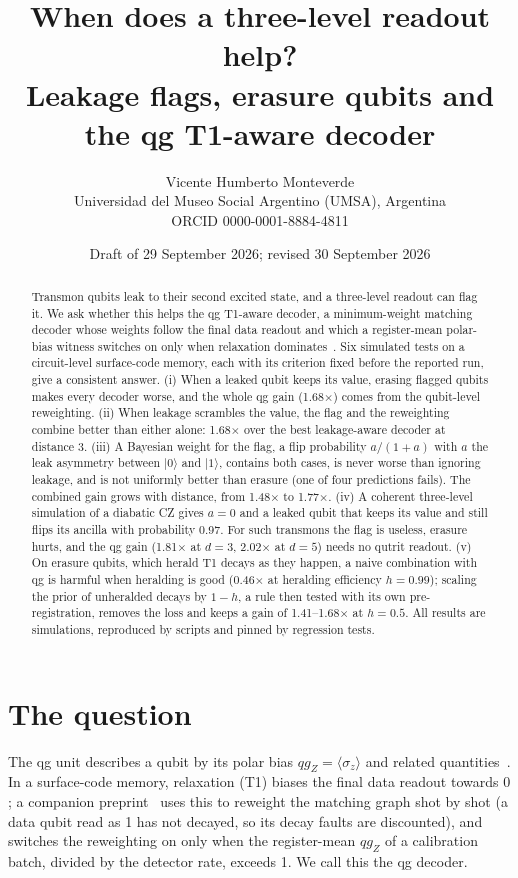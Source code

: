 \documentclass[11pt]{article}
\title{When does a three-level readout help?\\
Leakage flags, erasure qubits and the qg T1-aware decoder}
\author{Vicente Humberto Monteverde\\
\small Universidad del Museo Social Argentino (UMSA), Argentina\\
\small ORCID 0000-0001-8884-4811}
\date{\small Draft of 29 September 2026; revised 30 September 2026}
\newcommand{\qgZ}{qg_Z}
\begin{document}
\maketitle

\begin{abstract}
Transmon qubits leak to their second excited state, and a three-level readout can flag it. We ask
whether this helps the qg T1-aware decoder, a minimum-weight matching decoder whose weights follow the
final data readout and which a register-mean polar-bias witness switches on only when relaxation
dominates~\cite{monteverde2026qang,monteverde2026witness}. Six simulated tests on a circuit-level
surface-code memory, each with its criterion fixed before the reported run, give a consistent answer.
(i) When a leaked qubit keeps its value, erasing flagged qubits makes every decoder worse, and the
whole qg gain (1.68$\times$) comes from the qubit-level reweighting. (ii) When leakage scrambles the
value, the flag and the reweighting combine better than either alone: 1.68$\times$ over the best
leakage-aware decoder at distance 3. (iii) A Bayesian weight for the flag, a flip probability
$a/(1+a)$ with $a$ the leak asymmetry between $|0\rangle$ and $|1\rangle$, contains both cases, is
never worse than ignoring leakage, and is not uniformly better than erasure (one of four predictions
fails). The combined gain grows with distance, from 1.48$\times$ to 1.77$\times$. (iv) A coherent
three-level simulation of a diabatic CZ gives $a=0$ and a leaked qubit that keeps its value and still
flips its ancilla with probability 0.97. For such transmons the flag is useless, erasure hurts, and the
qg gain (1.81$\times$ at $d=3$, 2.02$\times$ at $d=5$) needs no qutrit readout. (v) On erasure qubits, which herald T1 decays as they happen, a naive
combination with qg is harmful when heralding is good (0.46$\times$ at heralding efficiency
$h=0.99$); scaling the prior of unheralded decays by $1-h$, a rule then tested with its own
pre-registration, removes the loss and keeps a gain of 1.41--1.68$\times$ at $h=0.5$. All results are
simulations, reproduced by scripts and pinned by regression tests.
\end{abstract}

\section{The question}

The qg unit describes a qubit by its polar bias $\qgZ=\langle\sigma_z\rangle$ and related
quantities~\cite{monteverde2026qang}. In a surface-code memory, relaxation (T1) biases the final data
readout towards $0$; a companion preprint~\cite{monteverde2026witness} uses this to reweight the
matching graph shot by shot (a data qubit read as 1 has not decayed, so its decay faults are
discounted), and switches the reweighting on only when the register-mean $\qgZ$ of a calibration batch,
divided by the detector rate, exceeds 1. We call this the qg decoder.
\end{document}
